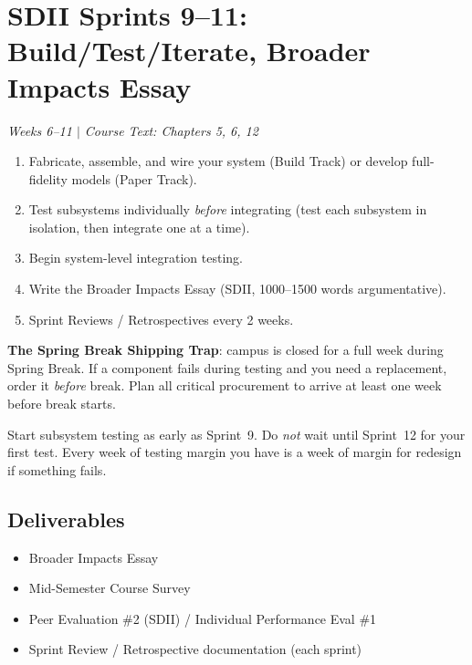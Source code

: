 \section{SDII Sprints 9--11: Build/Test/Iterate, Broader Impacts Essay}
\textit{Weeks 6--11 $|$ Course Text: Chapters 5, 6, 12}

\begin{priorities}
\begin{enumerate}[nosep]
\item Fabricate, assemble, and wire your system (Build Track) or develop full-fidelity models (Paper Track).
\item Test subsystems individually \emph{before} integrating (test each subsystem in isolation, then integrate one at a time).
\item Begin system-level integration testing.
\item Write the Broader Impacts Essay (SDII, 1000--1500 words argumentative).
\item Sprint Reviews / Retrospectives every 2 weeks.
\end{enumerate}
\end{priorities}

\begin{warnbox}
\textbf{The Spring Break Shipping Trap}: campus is closed for a full week during Spring Break. If a component fails during testing and you need a replacement, order it \emph{before} break. Plan all critical procurement to arrive at least one week before break starts.
\end{warnbox}

\begin{protip}
Start subsystem testing as early as Sprint~9. Do \emph{not} wait until Sprint~12 for your first test. Every week of testing margin you have is a week of margin for redesign if something fails.
\end{protip}

\subsection{Deliverables}
\begin{itemize}[nosep,leftmargin=1.5em]
\item Broader Impacts Essay
\item Mid-Semester Course Survey
\item Peer Evaluation \#2 (SDII) / Individual Performance Eval \#1
\item Sprint Review / Retrospective documentation (each sprint)
\end{itemize}


